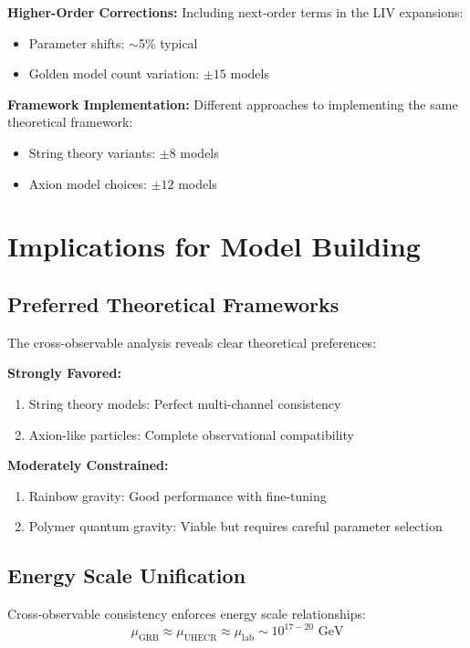 \documentclass[12pt]{article}
\begin{document}
\textbf{Higher-Order Corrections:}
Including next-order terms in the LIV expansions:
\begin{itemize}
\item Parameter shifts: $\sim$5\% typical
\item Golden model count variation: $\pm 15$ models
\end{itemize}

\textbf{Framework Implementation:}
Different approaches to implementing the same theoretical framework:
\begin{itemize}
\item String theory variants: $\pm 8$ models
\item Axion model choices: $\pm 12$ models
\end{itemize}

\section{Implications for Model Building}

\subsection{Preferred Theoretical Frameworks}

The cross-observable analysis reveals clear theoretical preferences:

\textbf{Strongly Favored:}
\begin{enumerate}
\item String theory models: Perfect multi-channel consistency
\item Axion-like particles: Complete observational compatibility
\end{enumerate}

\textbf{Moderately Constrained:}
\begin{enumerate}
\item Rainbow gravity: Good performance with fine-tuning
\item Polymer quantum gravity: Viable but requires careful parameter selection
\end{enumerate}

\subsection{Energy Scale Unification}

Cross-observable consistency enforces energy scale relationships:
\begin{equation}
\mu_{\text{GRB}} \approx \mu_{\text{UHECR}} \approx \mu_{\text{lab}} \sim 10^{17-20} \text{ GeV}
\end{equation}
\end{document}
